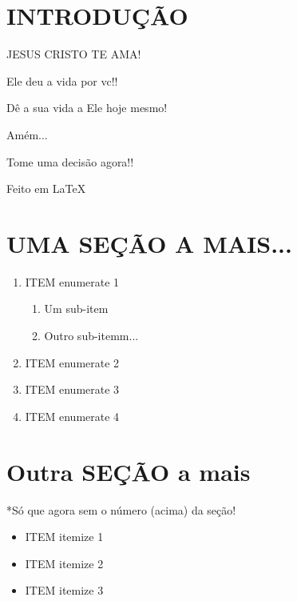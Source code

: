 \documentclass{article}
\begin{document}
\section{INTRODUÇÃO}
JESUS CRISTO TE AMA!

Ele deu a vida por vc!!

Dê a sua vida a Ele hoje mesmo!

Amém...

Tome uma decisão agora!!

Feito em {\LaTeX}


\section{UMA SEÇÃO A MAIS...}

\begin{enumerate}
	\item ITEM enumerate 1
		\begin{enumerate}
			\item Um sub-item
			\item Outro sub-itemm...
		\end{enumerate}
	\item ITEM enumerate 2
	\item ITEM enumerate 3
	\item ITEM enumerate 4
\end{enumerate}

\section*{Outra SEÇÃO a mais}
*Só que agora sem o número (acima) da seção!

\begin{itemize}
	\item ITEM itemize 1
	\item ITEM itemize 2
	\item ITEM itemize 3
\end{itemize}
\end{document}

